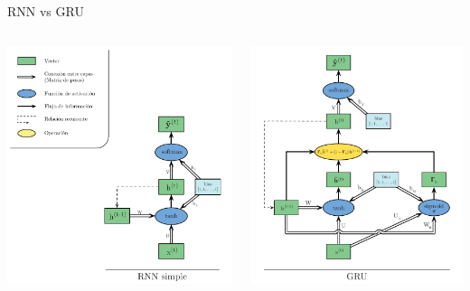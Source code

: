\documentclass[aspectratio=169]{beamer}
\begin{document}
\begin{frame}{RNN vs GRU}

	\begin{columns}
		\begin{column}{0.5\textwidth}
			\includegraphics[width=.9\textwidth, center]{imgs/tema4/rnn/RNNsimple.pdf}
		\end{column}

		\begin{column}{0.5\textwidth}
			\includegraphics[width=.85\textwidth, center]{imgs/tema4/rnn/GRU.pdf}
		\end{column}
	\end{columns}
\end{frame}
\end{document}
